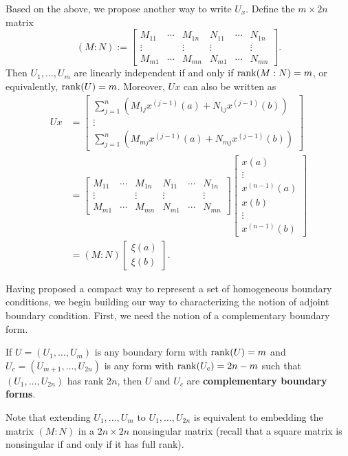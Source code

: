 \documentclass[11pt, oneside, a4paper]{article}
\begin{document}
Based on the above, we propose another way to write $U_x$. Define the $m\times 2n$ matrix
\[(M:N):=\begin{bmatrix}
    M_{11} & \cdots & M_{1n} & N_{11} & \cdots & N_{1n}\\
    \vdots &  & \vdots & \vdots & & \vdots\\
    M_{m1} & \cdots & M_{mn} & N_{m1} & \cdots & N_{mn}
\end{bmatrix}.\]
Then $U_1,\ldots,U_m$ are linearly independent if and only if $\operatorname{rank}(M:N)=m$, or equivalently, $\operatorname{rank}(U)=m$. 
Moreover, $Ux$ can also be written as
\begin{align*}
    Ux &= \begin{bmatrix}
        \sum_{j=1}^n (M_{1j}x^{(j-1)}(a) + N_{1j}x^{(j-1)}(b))\\
        \vdots\\
        \sum_{j=1}^n (M_{mj}x^{(j-1)}(a) + N_{mj}x^{(j-1)}(b))
    \end{bmatrix}\\
    &= \begin{bmatrix}
        M_{11} & \cdots & M_{1n} & N_{11} & \cdots & N_{1n}\\
        \vdots &  & \vdots & \vdots & & \vdots\\
        M_{m1} & \cdots & M_{mn} & N_{m1} & \cdots & N_{mn}
    \end{bmatrix} \begin{bmatrix}x(a)\\\vdots\\x^{(n-1)}(a)\\ x(b)\\\vdots\\x^{(n-1)}(b)\end{bmatrix}\\
    &= (M:N)\begin{bmatrix}
        \xi(a)\\
        \xi(b)
    \end{bmatrix}.
\end{align*}

Having proposed a compact way to represent a set of homogeneous boundary conditions, we begin building our way to characterizing the notion of adjoint boundary condition. First, we need the notion of a complementary boundary form.

\begin{defn}\cite[p.287]{CoddingtonLevinson}\label{defn:complementary boundary form}
    If $U=(U_1,\ldots, U_m)$ is any boundary form with $\operatorname{rank}(U)=m$ and $U_c=(U_{m+1},\ldots,U_{2n})$ is any form with $\operatorname{rank}(U_c)=2n-m$ such that $(U_1,\ldots, U_{2n})$ has rank $2n$, then $U$ and $U_c$ are \textbf{complementary boundary forms}. 
    
    Note that extending $U_{1},\ldots, U_{m}$ to $U_1,\ldots,U_{2n}$ is equivalent to embedding the matrix $(M:N)$ in a $2n\times 2n$ nonsingular matrix (recall that a square matrix is nonsingular if and only if it has full rank).
\end{defn}
\end{document}
